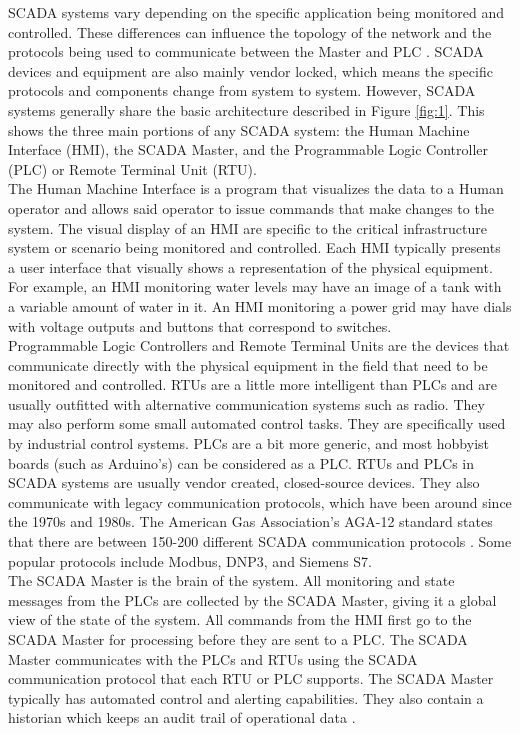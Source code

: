 \documentclass[oneside,11pt,a4paper,oldfontcommands]{book}
\begin{document}
\indent
SCADA systems vary depending on the specific application being monitored and controlled.
These differences can influence the topology of the network and the
protocols being used to communicate between the Master and PLC \cite{SCADANetworks}.
SCADA devices and equipment are also
mainly vendor locked, which means the specific protocols and components
change from system to system. However,
SCADA systems generally share the basic architecture described in Figure \ref{fig:1}. 
This shows the three main portions of any SCADA system: the Human Machine
Interface (HMI), the SCADA Master, and the Programmable Logic Controller (PLC) or Remote 
Terminal Unit (RTU). \\

\indent
The Human Machine Interface is a program that visualizes the data to a Human operator
and allows said operator to issue commands that make changes to the system. 
The visual display of an HMI are specific to the critical infrastructure
system or scenario being monitored and controlled. Each HMI typically presents
a user interface that visually shows a representation of the physical equipment.
For example, an HMI monitoring water levels may have an image of a tank with
a variable amount of water in it. An HMI monitoring a power grid may have 
dials with voltage outputs and buttons that correspond to switches. \\

\indent
Programmable Logic Controllers and Remote Terminal Units are the devices that
communicate directly with the physical equipment in the field that need to be
monitored and controlled. RTUs are a little more intelligent
than PLCs and are usually outfitted with alternative communication systems such as radio.
They may also perform some small automated control tasks. They are specifically used by 
industrial control systems. PLCs are a bit more generic, and most hobbyist boards (such as Arduino's)
can be considered as a PLC. RTUs and PLCs in SCADA systems are usually vendor 
created, closed-source devices. They also communicate with legacy communication protocols, 
which have been around since the 1970s and 1980s. 
The American Gas Association's AGA-12 standard states that there are between 150-200
different SCADA communication protocols \cite{SCADANetworks}. Some popular
protocols include Modbus, DNP3, and Siemens S7. \\

\indent
The SCADA Master is the brain of the system. All monitoring and state messages 
from the PLCs are collected by the SCADA Master, giving it a global
view of the state of the system. All commands from the HMI first go to the
SCADA Master for processing before they are sent to a PLC. 
The SCADA Master communicates with the PLCs and RTUs using the SCADA communication 
protocol that each RTU or PLC supports. The SCADA Master typically
has automated control and alerting capabilities. They also contain a historian which
keeps an audit trail of operational data \cite{CyberWarfare}.  \\
\end{document}
